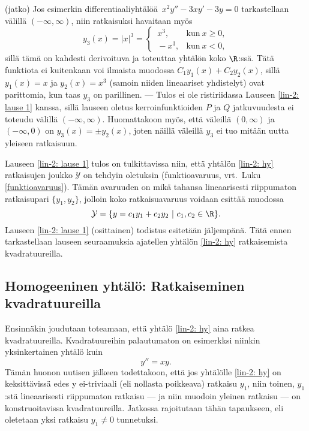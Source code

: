 \jatko \begin{Exa} (jatko) Jos esimerkin differentiaaliyhtälöä $\,x^2y''-3xy'-3y=0$
tarkastellaan välillä $(-\infty,\infty)$, niin ratkaisuksi havaitaan myös
\[
y_3(x) = |x|^3 = \begin{cases} 
                 \,x^3, &\text{kun}\ x \ge 0, \\ \,-x^3, &\text{kun}\ x<0,
                 \end{cases}
\]
sillä tämä on kahdesti derivoituva ja toteuttaa yhtälön koko $\R$:ssä. Tätä funktiota ei
kuitenkaan voi ilmaista muodossa $C_1y_1(x)+C_2y_2(x)$, sillä $y_1(x)=x$ ja $y_2(x)=x^3$
(samoin niiden lineaariset yhdistelyt) ovat parittomia, kun taas $y_3$ on parillinen. --- Tulos
ei ole ristiriidassa Lauseen \ref{lin-2: lause 1} kanssa, sillä lauseen oletus
kerroinfunktioiden $P$ ja $Q$ jatkuvuudesta ei toteudu välillä $(-\infty,\infty)$. Huomattakoon
myös, että väleillä $(0,\infty)$ ja $(-\infty,0)$ on $y_3(x)=\pm y_2(x)$, joten näillä
väleillä $y_3$ ei tuo mitään uutta yleiseen ratkaisuun. \loppu
\end{Exa}
Lauseen \ref{lin-2: lause 1} tulos on tulkittavissa niin, että yhtälön \eqref{lin-2: hy}
ratkaisujen joukko $\mathcal{Y}$ on tehdyin oletuksin  
(funktioavaruus, vrt.\ Luku \ref{funktioavaruus}). Tämän avaruuden  on mikä tahansa
lineaarisesti riippumaton ratkaisupari $\{y_1,y_2\}$, jolloin koko ratkaisuavaruus voidaan
esittää muodossa
\[
\mathcal{Y}=\{y=c_1y_1+c_2y_2 \ | \ c_1,c_2\in\R\}.
\]
Lauseen \ref{lin-2: lause 1} (osittainen) todistus esitetään jäljempänä. Tätä ennen 
tarkastellaan lauseen seuraamuksia ajatellen yhtälön \eqref{lin-2: hy} ratkaisemista
kvadratuureilla.

\subsection*{Homogeeninen yhtälö: Ratkaiseminen kvadratuureilla}

Ensinnäkin joudutaan toteamaan, että yhtälö \eqref{lin-2: hy}  aina ratkea
kvadratuureilla. Kvadratuureihin palautumaton on esimerkksi niinkin yksinkertainen yhtälö kuin
\[
y''=xy.
\]
Tämän huonon uutisen jälkeen todettakoon, että jos yhtälölle \eqref{lin-2: hy} on 
keksittävissä edes y ei-triviaali (eli nollasta poikkeava) ratkaisu $y_1$, niin toinen, 
$y_1$:stä lineaarisesti riippumaton ratkaisu --- ja niin muodoin yleinen ratkaisu --- on
konstruoitavissa kvadratuureilla. Jatkossa rajoitutaan tähän tapaukseen, eli oletetaan yksi
ratkaisu $y_1 \neq 0$ tunnetuksi.

